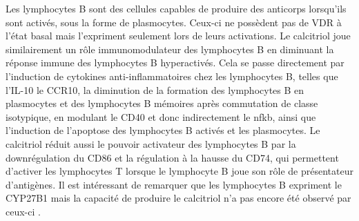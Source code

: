 \documentclass[
  a4paper,
  DIV=11,
  numbers=noendperiod,
  listof=totoc]{scrreprt}
\begin{document}
Les lymphocytes B sont des cellules capables de produire des anticorps
lorsqu'ils sont activés, sous la forme de plasmocytes. Ceux-ci ne
possèdent pas de VDR à l'état basal mais l'expriment seulement lors de
leurs activations. Le calcitriol joue similairement un rôle
immunomodulateur des lymphocytes B en diminuant la réponse immune des
lymphocytes B hyperactivés. Cela se passe directement par l'induction de
cytokines anti-inflammatoires chez les lymphocytes B, telles que
l'\ac{IL-10} le \ac{CCR10}, la diminution de la formation des
lymphocytes B en plasmocytes et des lymphocytes B mémoires après
commutation de classe isotypique, en modulant le CD40 et donc
indirectement le \ac{nfkb}, ainsi que l'induction de l'apoptose des
lymphocytes B activés et les plasmocytes. Le calcitriol réduit aussi le
pouvoir activateur des lymphocytes B par la downrégulation du CD86 et la
régulation à la hausse du CD74, qui permettent d'activer les lymphocytes
T lorsque le lymphocyte B joue son rôle de présentateur d'antigènes. Il
est intéressant de remarquer que les lymphocytes B expriment le
\ac{CYP27B1} mais la capacité de produire le calcitriol n'a pas encore
été observé par ceux-ci \autocite{Meza-Meza.2022,Martens.2020}.
\end{document}
